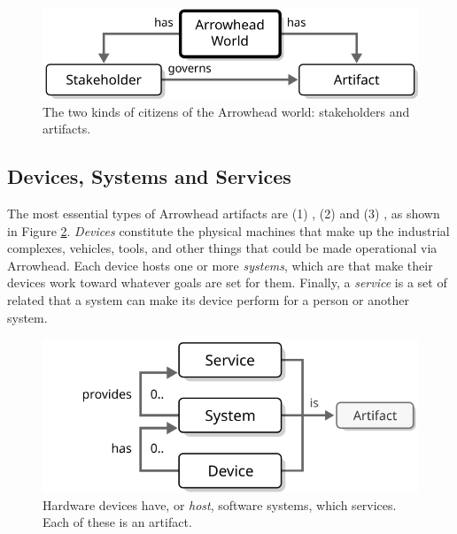 \begin{figure}[ht!]
  \centering
  \includegraphics[scale=0.9]{figures/world}
  \caption{
    The two kinds of citizens of the Arrowhead world: stakeholders and artifacts.
  }
  \label{fig:world}
\end{figure}

\subsection{Devices, Systems and Services}

The most essential types of Arrowhead artifacts are (1) , (2)  and (3) , as shown in Figure \ref{fig:device-system-service}.
\textit{Devices} constitute the physical machines that make up the industrial complexes, vehicles, tools, and other things that could be made operational via Arrowhead.
Each device hosts one or more \textit{systems}, which are   that make their devices work toward whatever goals are set for them.
Finally, a \textit{service} is a set of related  that a system can make its device perform for a person or another system.

\begin{figure}[ht!]
  \centering
  \includegraphics[scale=0.9]{figures/device-system-service}
  \caption{
    Hardware devices have, or \textit{host}, software systems, which  services.
    Each of these is an artifact.
  }
  \label{fig:device-system-service}
\end{figure}

